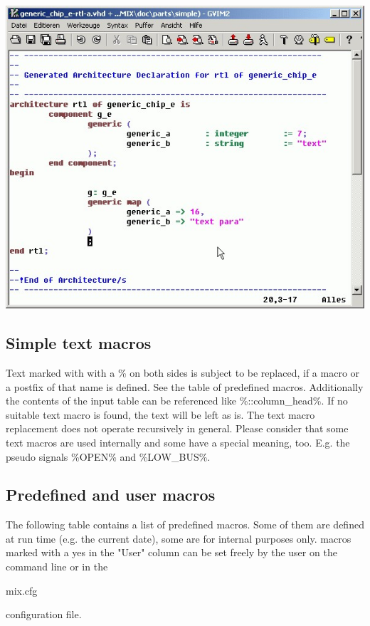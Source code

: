\documentclass[a4paper,12pt]{article}
\begin{document}
\includegraphics[scale=0.8]{images/mix_generic_chip.jpg}\\

\subsection{Simple text macros}
Text marked with with a \% on both sides is subject to be replaced, if a macro or a postfix of that name is defined. See the table of predefined macros. Additionally the contents of the input table can be referenced like \%::column\_head\%. If no suitable text macro is found, the text will be left as is.\newline
The text macro replacement does not operate recursively in general.\newline
\newline
Please consider that some text macros are used internally and some have a special meaning, too. E.g. the pseudo signals \%OPEN\% and \%LOW\_BUS\%.

\subsection{Predefined and user macros}
The following table contains a list of predefined macros. Some of them are defined at run time (e.g. the current date), some are for internal purposes only. macros marked with a yes in the "User" column can be set freely by the user on the command line or in the \begin{tt}mix.cfg\end{tt} configuration file.\newline
\end{document}
